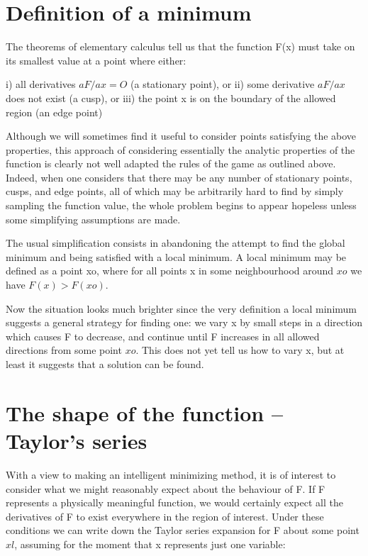  
\section{Definition of a minimum}
 
     The theorems of elementary calculus tell us that the function
F(x) must take on its smallest value at a point where either:
 
  i) all derivatives $aF/ax = O$ (a stationary point), or
 ii) some derivative $aF/ax$ does not exist (a cusp), or
iii) the point x is on the boundary of the allowed region (an edge point)
 
     Although we will sometimes find it useful to consider points
satisfying the above properties, this approach of considering essentially
the analytic properties of the function is clearly not well adapted
the rules of the game as outlined above.  Indeed, when one considers that
there may be any number of stationary points, cusps, and edge points,
all of which may be arbitrarily hard to find by simply sampling the
function value, the whole problem begins to appear hopeless unless some
simplifying assumptions are made.
 
     The usual simplification consists in abandoning the attempt to find
the global minimum and being satisfied with a local minimum.  A local
minimum may be defined as a point xo, where for all points x in some
neighbourhood around $xo$ we have $F(x) > F(xo)$.
 
     Now the situation looks much brighter since the very definition
a local minimum suggests a general strategy for finding one:  we vary x
by small steps in a direction which causes F to decrease, and continue
until F increases in all allowed directions from some point $xo.$  This
does not yet tell us how to vary x, but at least it suggests that a solution
can be found.
 
 
\section{The shape of the function -- Taylor's series}
 
     With a view to making an intelligent minimizing method, it is of
interest to consider what we might reasonably expect about the behaviour
of F.  If F represents a physically meaningful function, we would certainly
expect all the derivatives of F to exist everywhere in the region of
interest.  Under these conditions we can write down the Taylor series
expansion for F about some point $xl$, assuming for the moment that x
represents just one variable:
 
